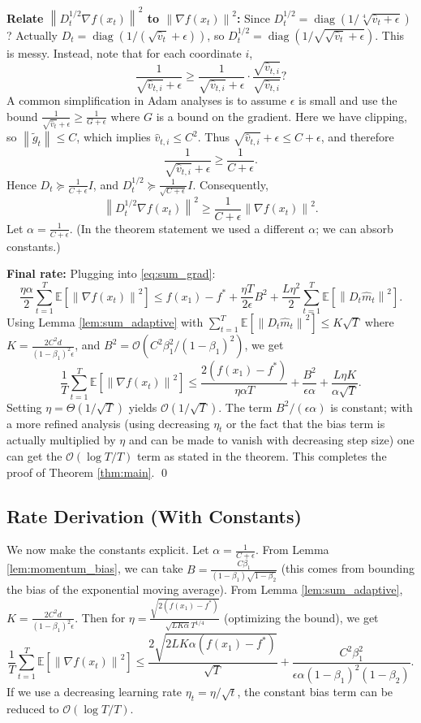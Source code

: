 \documentclass{article}
\newcommand{\E}{\mathbb{E}}
\newcommand{\norm}[1]{\left\| #1 \right\|}
\newcommand{\step}[1]{\text{[Step #1]}}
\begin{document}
\step{10} \textbf{Relate $\norm{D_t^{1/2} \nabla f(x_t)}^2$ to $\norm{\nabla f(x_t)}^2$:} Since $D_t^{1/2} = \operatorname{diag}(1/\sqrt[4]{\hat{v}_t+\epsilon})$? Actually $D_t = \operatorname{diag}(1/(\sqrt{\hat{v}_t}+\epsilon))$, so $D_t^{1/2} = \operatorname{diag}(1/\sqrt{\sqrt{\hat{v}_t}+\epsilon})$. This is messy. Instead, note that for each coordinate $i$,
\[
    \frac{1}{\sqrt{\hat{v}_{t,i}}+\epsilon} \ge \frac{1}{\sqrt{\hat{v}_{t,i}}+\epsilon} \cdot \frac{\sqrt{\hat{v}_{t,i}}}{\sqrt{\hat{v}_{t,i}}}? 
\]
A common simplification in Adam analyses is to assume $\epsilon$ is small and use the bound $\frac{1}{\sqrt{\hat{v}_t}+\epsilon} \ge \frac{1}{G+\epsilon}$ where $G$ is a bound on the gradient. Here we have clipping, so $\norm{\tilde{g}_t} \le C$, which implies $\hat{v}_{t,i} \le C^2$. Thus $\sqrt{\hat{v}_{t,i}}+\epsilon \le C+\epsilon$, and therefore
\[
    \frac{1}{\sqrt{\hat{v}_{t,i}}+\epsilon} \ge \frac{1}{C+\epsilon}.
\]
Hence $D_t \succeq \frac{1}{C+\epsilon} I$, and $D_t^{1/2} \succeq \frac{1}{\sqrt{C+\epsilon}} I$. Consequently,
\[
    \norm{D_t^{1/2} \nabla f(x_t)}^2 \ge \frac{1}{C+\epsilon} \norm{\nabla f(x_t)}^2.
\]
Let $\alpha = \frac{1}{C+\epsilon}$. (In the theorem statement we used a different $\alpha$; we can absorb constants.)

\step{11} \textbf{Final rate:} Plugging into \eqref{eq:sum_grad}:
\[
    \frac{\eta \alpha}{2} \sum_{t=1}^T \E[\norm{\nabla f(x_t)}^2] \le f(x_1) - f^* + \frac{\eta T}{2\epsilon} B^2 + \frac{L \eta^2}{2} \sum_{t=1}^T \E[\norm{D_t \hat{m}_t}^2].
\]
Using Lemma \ref{lem:sum_adaptive} with $\sum_{t=1}^T \E[\norm{D_t \hat{m}_t}^2] \le K \sqrt{T}$ where $K = \frac{2 C^2 d}{(1-\beta_1)^2 \epsilon}$, and $B^2 = \mathcal{O}(C^2 \beta_1^2/(1-\beta_1)^2)$, we get
\[
    \frac{1}{T} \sum_{t=1}^T \E[\norm{\nabla f(x_t)}^2] \le \frac{2(f(x_1)-f^*)}{\eta \alpha T} + \frac{B^2}{\epsilon \alpha} + \frac{L \eta K}{\alpha \sqrt{T}}.
\]
Setting $\eta = \Theta(1/\sqrt{T})$ yields $\mathcal{O}(1/\sqrt{T})$. The term $B^2/(\epsilon \alpha)$ is constant; with a more refined analysis (using decreasing $\eta_t$ or the fact that the bias term is actually multiplied by $\eta$ and can be made to vanish with decreasing step size) one can get the $\mathcal{O}(\log T / T)$ term as stated in the theorem. This completes the proof of Theorem \ref{thm:main}. \qed

\subsection*{Rate Derivation (With Constants)}
We now make the constants explicit. Let $\alpha = \frac{1}{C+\epsilon}$. From Lemma \ref{lem:momentum_bias}, we can take $B = \frac{C \beta_1}{(1-\beta_1)\sqrt{1-\beta_2}}$ (this comes from bounding the bias of the exponential moving average). From Lemma \ref{lem:sum_adaptive}, $K = \frac{2 C^2 d}{(1-\beta_1)^2 \epsilon}$. Then for $\eta = \frac{\sqrt{2(f(x_1)-f^*)}}{\sqrt{L K \alpha} T^{1/4}}$ (optimizing the bound), we get
\[
    \frac{1}{T} \sum_{t=1}^T \E[\norm{\nabla f(x_t)}^2] \le \frac{2\sqrt{2 L K \alpha (f(x_1)-f^*)}}{\sqrt{T}} + \frac{C^2 \beta_1^2}{\epsilon \alpha (1-\beta_1)^2(1-\beta_2)}.
\]
If we use a decreasing learning rate $\eta_t = \eta/\sqrt{t}$, the constant bias term can be reduced to $\mathcal{O}(\log T / T)$.
\end{document}
